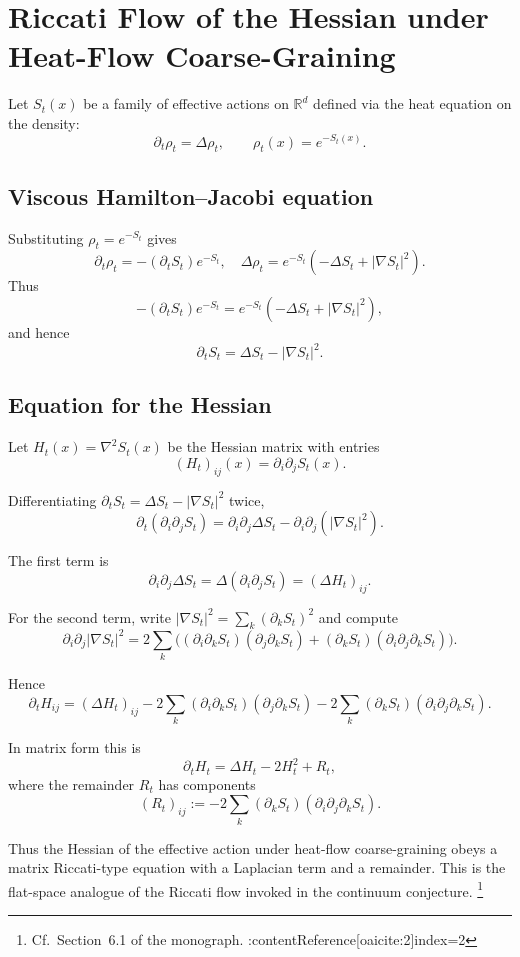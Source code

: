 
\section{Riccati Flow of the Hessian under Heat-Flow Coarse-Graining}

Let $S_t(x)$ be a family of effective actions on $\mathbb{R}^d$ defined via the heat equation
on the density:
\[
\partial_t \rho_t = \Delta \rho_t, \qquad \rho_t(x) = e^{-S_t(x)}.
\]

\subsection{Viscous Hamilton--Jacobi equation}

Substituting $\rho_t = e^{-S_t}$ gives
\[
\partial_t \rho_t = -(\partial_t S_t) e^{-S_t}, \quad
\Delta \rho_t = e^{-S_t}(-\Delta S_t + |\nabla S_t|^2).
\]
Thus
\[
-(\partial_t S_t)e^{-S_t}
= e^{-S_t}(-\Delta S_t + |\nabla S_t|^2),
\]
and hence
\[
\partial_t S_t = \Delta S_t - |\nabla S_t|^2.
\]

\subsection{Equation for the Hessian}

Let $H_t(x) = \nabla^2 S_t(x)$ be the Hessian matrix with entries
\[
(H_t)_{ij}(x) = \partial_i\partial_j S_t(x).
\]

Differentiating $\partial_t S_t = \Delta S_t - |\nabla S_t|^2$ twice,
\[
\partial_t(\partial_i\partial_j S_t)
= \partial_i\partial_j \Delta S_t
 - \partial_i\partial_j(|\nabla S_t|^2).
\]

The first term is
\[
\partial_i\partial_j \Delta S_t = \Delta(\partial_i\partial_j S_t) = (\Delta H_t)_{ij}.
\]

For the second term, write $|\nabla S_t|^2 = \sum_k (\partial_k S_t)^2$ and compute
\[
\partial_i\partial_j |\nabla S_t|^2
= 2\sum_k \big( (\partial_i\partial_k S_t)(\partial_j\partial_k S_t)
 + (\partial_k S_t)(\partial_i\partial_j\partial_k S_t)\big).
\]

Hence
\[
\partial_t H_{ij}
= (\Delta H_t)_{ij}
 - 2\sum_k (\partial_i\partial_k S_t)(\partial_j\partial_k S_t)
 - 2\sum_k (\partial_k S_t)(\partial_i\partial_j\partial_k S_t).
\]

In matrix form this is
\[
\partial_t H_t
= \Delta H_t - 2H_t^2 + R_t,
\]
where the remainder $R_t$ has components
\[
(R_t)_{ij}
:= -2\sum_k (\partial_k S_t)(\partial_i\partial_j\partial_k S_t).
\]

Thus the Hessian of the effective action under heat-flow coarse-graining
obeys a matrix Riccati-type equation with a Laplacian term and a remainder.
This is the flat-space analogue of the Riccati flow invoked in the continuum conjecture.%
\footnote{Cf.\ Section~6.1 of the monograph. :contentReference[oaicite:2]{index=2}}
